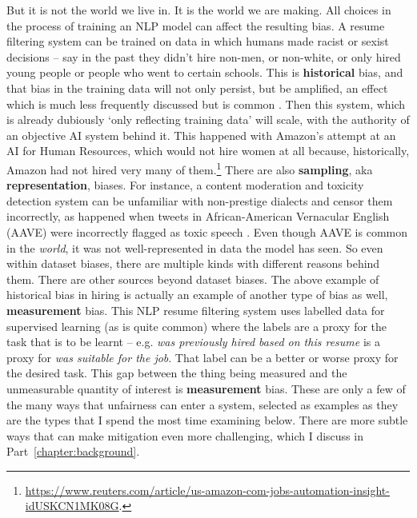 But it is not the world we live in. It is the world we are making. All choices in the process of training an NLP model can affect the resulting bias. A resume filtering system can be trained on data in which humans made racist or sexist decisions -- say in the past they didn't hire non-men, or non-white, or only hired young people or people who went to certain schools. This is \textbf{historical} bias, and that bias in the training data will not only persist, but be amplified, an effect which is much less frequently discussed but is common \citep{zhao-etal-2017-men, jia-etal-2020-mitigating, cabello-etal-2023-evaluating, pmlr-v80-hashimoto18a}. 
Then this system, which is already dubiously `only reflecting training data' will scale, with the authority of an objective AI system behind it. This happened with Amazon's attempt at an AI for Human Resources, which would not hire women at all because, historically, Amazon had not hired very many of them.\footnote{\url{https://www.reuters.com/article/us-amazon-com-jobs-automation-insight-idUSKCN1MK08G}.} There are also \textbf{sampling}, aka \textbf{representation}, biases. For instance, a content moderation and toxicity detection system can be unfamiliar with non-prestige dialects and censor them incorrectly, as happened when tweets in African-American Vernacular English (AAVE) were incorrectly flagged as toxic speech \citep{sap-etal-2019-risk}. Even though AAVE is common in the \textit{world}, it was not well-represented in data the model has seen. So even within dataset biases, there are multiple kinds with different reasons behind them. There are other sources beyond dataset biases. The above example of historical bias in hiring is actually an example of another type of bias as well, \textbf{measurement} bias. This NLP resume filtering system uses labelled data for supervised learning (as is quite common) where the labels are a proxy for the task that is to be learnt -- e.g. \textit{was previously hired based on this resume} is a proxy for \textit{was suitable for the job}. That label can be a better or worse proxy for the desired task. This gap between the thing being measured and the unmeasurable quantity of interest is \textbf{measurement} bias. These are only a few of the many ways that unfairness can enter a system, selected as examples as they are the types that I spend the most time examining below. There are more subtle ways that can make mitigation even more challenging, which I discuss in Part~\ref{chapter:background}.

